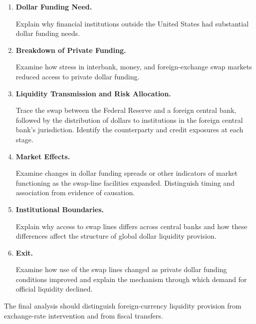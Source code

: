 \begin{enumerate}

\item \textbf{Dollar Funding Need.}

Explain why financial institutions outside the United States had substantial dollar funding needs.

\item \textbf{Breakdown of Private Funding.}

Examine how stress in interbank, money, and foreign-exchange swap markets reduced access to private dollar funding.

\item \textbf{Liquidity Transmission and Risk Allocation.}

Trace the swap between the Federal Reserve and a foreign central bank, followed by the distribution of dollars to institutions in the foreign central bank's jurisdiction. Identify the counterparty and credit exposures at each stage.

\item \textbf{Market Effects.}

Examine changes in dollar funding spreads or other indicators of market functioning as the swap-line facilities expanded. Distinguish timing and association from evidence of causation.

\item \textbf{Institutional Boundaries.}

Explain why access to swap lines differs across central banks and how these differences affect the structure of global dollar liquidity provision.

\item \textbf{Exit.}

Examine how use of the swap lines changed as private dollar funding conditions improved and explain the mechanism through which demand for official liquidity declined.

\end{enumerate}

The final analysis should distinguish foreign-currency liquidity provision from exchange-rate intervention and from fiscal transfers.





